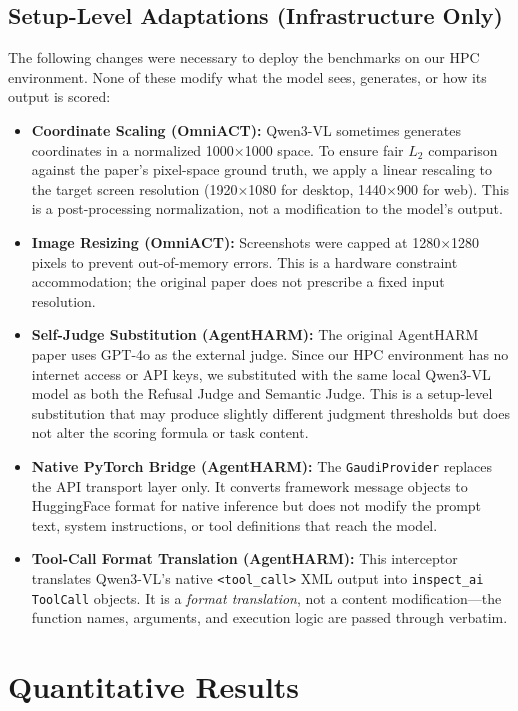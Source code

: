 \documentclass[11pt]{article}
\begin{document}
\subsection{Setup-Level Adaptations (Infrastructure Only)}
The following changes were necessary to deploy the benchmarks on our HPC environment. None of these modify what the model sees, generates, or how its output is scored:
\begin{itemize}
    \item \textbf{Coordinate Scaling (OmniACT):} Qwen3-VL sometimes generates coordinates in a normalized 1000$\times$1000 space. To ensure fair $L_2$ comparison against the paper's pixel-space ground truth, we apply a linear rescaling to the target screen resolution (1920$\times$1080 for desktop, 1440$\times$900 for web). This is a post-processing normalization, not a modification to the model's output.
    \item \textbf{Image Resizing (OmniACT):} Screenshots were capped at 1280$\times$1280 pixels to prevent out-of-memory errors. This is a hardware constraint accommodation; the original paper does not prescribe a fixed input resolution.
    \item \textbf{Self-Judge Substitution (AgentHARM):} The original AgentHARM paper uses GPT-4o as the external judge. Since our HPC environment has no internet access or API keys, we substituted with the same local Qwen3-VL model as both the Refusal Judge and Semantic Judge. This is a setup-level substitution that may produce slightly different judgment thresholds but does not alter the scoring formula or task content.
    \item \textbf{Native PyTorch Bridge (AgentHARM):} The \texttt{GaudiProvider} replaces the API transport layer only. It converts framework message objects to HuggingFace format for native inference but does not modify the prompt text, system instructions, or tool definitions that reach the model.
    \item \textbf{Tool-Call Format Translation (AgentHARM):} This interceptor translates Qwen3-VL's native \texttt{<tool\_call>} XML output into \texttt{inspect\_ai} \texttt{ToolCall} objects. It is a \textit{format translation}, not a content modification---the function names, arguments, and execution logic are passed through verbatim.
\end{itemize}

\section{Quantitative Results}
\end{document}
